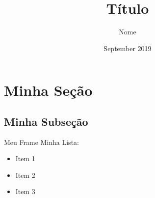 \documentclass{beamer}
\title{Título}
\author{Nome}
\date{September 2019}
\begin{document}
\maketitle

\section{Minha Seção}

\subsection{Minha Subseção}

\begin{frame}{Meu Frame}
Minha Lista:
\pause
\begin{itemize}
    \item<2-> Item 1
    \item<3-> Item 2
    \item<4-> Item 3
\end{itemize}
\end{frame}
\end{document}
